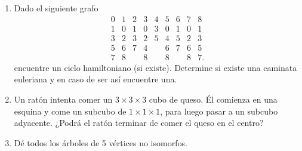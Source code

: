 \documentclass[a4paper,12pt,twoside,spanish,reqno]{amsbook}
\numberwithin{equation}{section}
\begin{document}
\begin{enumerate}
\begin{enumerate}
 (i) (4) y (2),\quad

 (ii) (5) y (6), \quad

 (iii) (5) y (1).



\item Halle las componentes conexas del grafo (7).
\end{enumerate} 


\item Dado el siguiente grafo
$$
\begin{matrix}
0&1&2&3&4&5&6&7&8\\ \hline
1&0&1&0&3&0&1&0&1\\
3&2&3&2&5&4&5&2&3\\
5&6&7&4&&6&7&6&5\\
7&8&&8&&8&&8&7.
\end{matrix}
$$
encuentre un ciclo hamiltoniano (si existe). Determine si existe una caminata euleriana y en caso de ser así encuentre una. 


\item Un ratón intenta comer un $3\times 3\times 3$ cubo de queso. Él comienza en una esquina y come un subcubo de $1\times 1\times 1$, para luego pasar a un subcubo adyacente. ¿Podrá el ratón terminar de comer el queso en el centro?

\item Dé todos los árboles de 5 vértices no isomorfos.



\end{enumerate}
\end{document}

